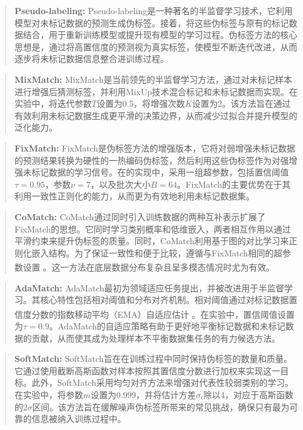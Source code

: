 \begin{quote}
	\textbf{Pseudo-labeling:} Pseudo-labeling是一种著名的半监督学习技术，它利用模型对未标记数据的预测生成伪标签。接着，将这些伪标签与原有的标记数据结合，用于重新训练模型或提升现有模型的学习过程。伪标签方法的核心思想是，通过将高置信度的预测视为真实标签，使模型不断迭代改进，从而逐步将未标记数据信息整合进训练过程。
\end{quote}

\begin{quote}
	\textbf{MixMatch:} MixMatch是当前领先的半监督学习方法，通过对未标记样本进行增强后猜测标签，并利用MixUp技术混合标记和未标记数据而实现。在实验中，将迭代参数$T$设置为0.5，将增强次数$K$设置为2。该方法旨在通过有效利用未标记数据生成更平滑的决策边界，从而减少过拟合并提升模型的泛化能力。
\end{quote}

\begin{quote}
	\textbf{FixMatch:} FixMatch是伪标签方法的增强版本，它将对弱增强未标记数据的预测结果转换为硬性的一热编码伪标签，然后利用这些伪标签作为对强增强未标记数据的学习信号。在的实现中，采用一组超参数，包括置信阈值$\tau = 0.95$，参数$\nu = 7$，以及批次大小$B = 64$。FixMatch的主要优势在于其利用一致性正则化的能力，从而更为有效地利用未标记数据集。
\end{quote}

\begin{quote}
	\textbf{CoMatch:} CoMatch通过同时引入训练数据的两种互补表示扩展了FixMatch的思想。它同时学习类别概率和低维嵌入，两者相互作用以通过平滑约束来提升伪标签的质量。同时，CoMatch利用基于图的对比学习来正则化嵌入结构。为了保证一致性和便于比较，遵循与FixMatch相同的超参数设置 \textsuperscript{\cite{sohn2020fixmatch}}。这一方法在底层数据分布复杂且呈多模态情况时尤为有效。
\end{quote}

\begin{quote}
	\textbf{AdaMatch:} AdaMatch最初为领域适应任务提出，并被改进用于半监督学习。其核心特性包括相对阈值和分布对齐机制。相对阈值通过对标记数据置信度分数的指数移动平均（EMA）自适应估计 \textsuperscript{\cite{tarvainen2017mean}}。在实验中，置信阈值设置为$\tau = 0.9$。AdaMatch的自适应策略有助于更好地平衡标记数据和未标记数据的贡献，从而使其成为处理样本不平衡数据集任务的有力候选方法。
\end{quote}

\begin{quote}
	\textbf{SoftMatch:} SoftMatch旨在在训练过程中同时保持伪标签的数量和质量。它通过使用截断高斯函数对样本按照其置信度分数进行加权来实现这一目标。此外，SoftMatch采用均匀对齐方法来增强对代表性较弱类别的学习。在实验中，将参数$m$设置为0.999，并将估计方差${{\hat \sigma }_t}$除以4，对应于高斯函数的$2\sigma$区间。该方法旨在缓解噪声伪标签所带来的常见挑战，确保只有最为可靠的信息被纳入训练过程中。
\end{quote}

